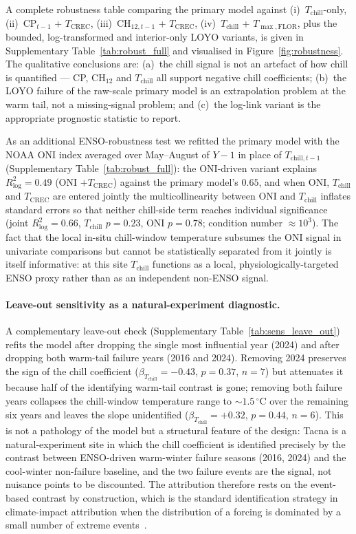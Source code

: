 \documentclass[agronomy,article,submit,pdftex,moreauthors]{Definitions/mdpi}
\begin{document}
A complete robustness table comparing the primary model against (i)~$T_{\text{chill}}$-only, (ii)~CP$_{t-1}$ + $T_{\text{CREC}}$, (iii)~CH$_{12,t-1}$ + $T_{\text{CREC}}$, (iv)~$T_{\text{chill}}$ + $T_{\max,\text{FLOR}}$, plus the bounded, log-transformed and interior-only LOYO variants, is given in Supplementary Table~\ref{tab:robust_full} and visualised in Figure~\ref{fig:robustness}. The qualitative conclusions are: (a)~the chill signal is not an artefact of how chill is quantified --- CP, CH$_{12}$ and $T_{\text{chill}}$ all support negative chill coefficients; (b)~the LOYO failure of the raw-scale primary model is an extrapolation problem at the warm tail, not a missing-signal problem; and (c)~the log-link variant is the appropriate prognostic statistic to report.

As an additional ENSO-robustness test we refitted the primary model with the NOAA ONI index averaged over May--August of $Y-1$ in place of $T_{\text{chill},t-1}$ (Supplementary Table~\ref{tab:robust_full}): the ONI-driven variant explains $R^{2}_{\log}=0.49$ (ONI $+ T_{\text{CREC}}$) against the primary model's $0.65$, and when ONI, $T_{\text{chill}}$ and $T_{\text{CREC}}$ are entered jointly the multicollinearity between ONI and $T_{\text{chill}}$ inflates standard errors so that neither chill-side term reaches individual significance (joint $R^{2}_{\log}=0.66$, $T_{\text{chill}}$ $p=0.23$, ONI $p=0.78$; condition number $\approx 10^{3}$). The fact that the local in-situ chill-window temperature subsumes the ONI signal in univariate comparisons but cannot be statistically separated from it jointly is itself informative: at this site $T_{\text{chill}}$ functions as a local, physiologically-targeted ENSO proxy rather than as an independent non-ENSO signal.

\paragraph{Leave-out sensitivity as a natural-experiment diagnostic.} A complementary leave-out check (Supplementary Table~\ref{tab:sens_leave_out}) refits the model after dropping the single most influential year (2024) and after dropping both warm-tail failure years (2016 and 2024). Removing 2024 preserves the sign of the chill coefficient ($\beta_{T_{\text{chill}}}=-0.43$, $p=0.37$, $n=7$) but attenuates it because half of the identifying warm-tail contrast is gone; removing both failure years collapses the chill-window temperature range to ${\sim}1.5\,^{\circ}$C over the remaining six years and leaves the slope unidentified ($\beta_{T_{\text{chill}}}=+0.32$, $p=0.44$, $n=6$). This is not a pathology of the model but a structural feature of the design: Tacna is a natural-experiment site in which the chill coefficient is identified precisely by the contrast between ENSO-driven warm-winter failure seasons (2016, 2024) and the cool-winter non-failure baseline, and the two failure events are the signal, not nuisance points to be discounted. The attribution therefore rests on the event-based contrast by construction, which is the standard identification strategy in climate-impact attribution when the distribution of a forcing is dominated by a small number of extreme events~\cite{lobellburke2010,dipaola2023olive}.
\end{document}
